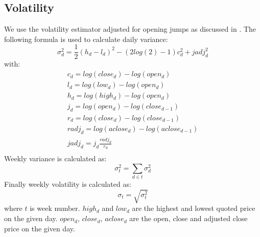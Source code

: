 \subsection*{Volatility}
We use the \cite{garman} volatility estimator adjusted for opening jumps as discussed in \cite{molnar_volatility}.
The following formula is used to calculate daily variance:
\begin{equation}
   \label{w_volatility} 
    \sigma^2_{d} = \frac{1}{2}(h_d-l_d)^2-(2log(2)-1)c_d^2+jadj_d^2
\end{equation}
with:
\begin{equation}
\begin{split}
c_{d} = log(close_{d})-log(open_{d}) \\
l_{d} = log(low_{d})-log(open_{d}) \\
h_{d} = log(high_{d})-log(open_{d}) \\
j_{d} = log(open_{d})-log(close_{d-1}) \\
r_{d} = log(close_{d})-log(close_{d-1}) \\
radj_{d} = log(aclose_{d})-log(aclose_{d-1}) \\
jadj_{d} = j_{d} \frac{radj_{d}}{r_{d}} \\
\end{split}
\end{equation}
Weekly variance is calculated as:
\begin{equation}
   \label{w_volatility} 
    \sigma^2_{t} = \sum_{d \in t} \sigma^2_{d} 
\end{equation}
Finally weekly volatility is calculated as:
\begin{equation}
   \label{w_volatility} 
    \sigma_t = \sqrt{\sigma^2_t}
\end{equation}
 where $t$ is week number. $high_{d}$ and $low_{d}$ are the highest and lowest quoted price on the given day. $open_{d}$, $close_{d}$, $aclose_{d}$ are the open, close and adjusted close price on the given day. 

